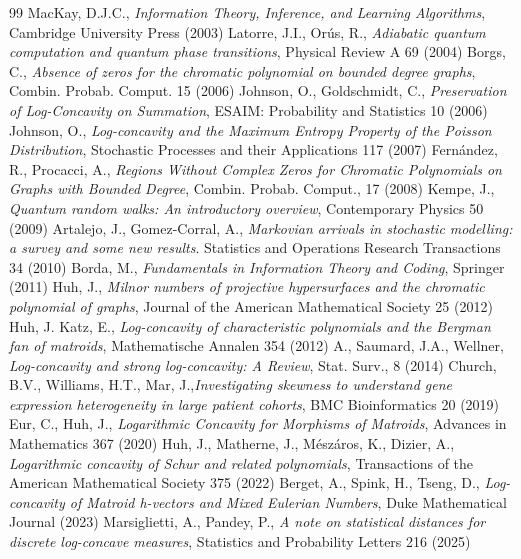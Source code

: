 \documentclass[a4paper,12pt]{article}
\begin{document}
\begin{thebibliography}{99}
 MacKay, D.J.C., \textit{Information Theory, Inference, and Learning Algorithms}, Cambridge University Press (2003)
 Latorre, J.I., Orús, R., \textit{Adiabatic quantum computation and quantum phase transitions}, Physical Review A 69 (2004)
 Borgs, C., \textit{Absence of zeros for the chromatic polynomial on bounded degree graphs}, Combin. Probab. Comput. 15 (2006)
 Johnson, O., Goldschmidt, C., \emph{Preservation of Log-Concavity on Summation}, ESAIM: Probability and Statistics 10 (2006)
 Johnson, O., \emph{Log-concavity and the Maximum Entropy Property of the Poisson Distribution}, Stochastic Processes and their Applications 117 (2007)
 Fernández, R., Procacci, A., \textit{Regions Without Complex Zeros for Chromatic Polynomials on Graphs with Bounded Degree}, Combin. Probab. Comput., 17 (2008)
 Kempe, J., \textit{Quantum random walks: An introductory overview}, Contemporary Physics 50 (2009)
 Artalejo, J., Gomez-Corral, A., \textit{Markovian arrivals in stochastic modelling: a survey and some new results}. Statistics and Operations Research Transactions 34 (2010)
 Borda, M., \textit{Fundamentals in Information Theory and Coding}, Springer (2011)
 Huh, J., \textit{Milnor numbers of projective hypersurfaces and the chromatic polynomial of graphs}, Journal of the American Mathematical Society 25
(2012)
 Huh, J. Katz, E., \textit{Log-concavity of characteristic polynomials and the Bergman fan of matroids}, Mathematische Annalen 354 (2012)
 A., Saumard, J.A., Wellner, \textit{Log-concavity and strong log-concavity: A Review}, Stat. Surv., 8 (2014)
 Church, B.V., Williams, H.T., Mar, J.,\textit{Investigating skewness to understand gene expression heterogeneity in large patient cohorts}, BMC Bioinformatics 20 (2019)
 Eur, C., Huh, J., \textit{Logarithmic Concavity for Morphisms of Matroids}, Advances in Mathematics 367 (2020)
 Huh, J., Matherne, J., Mészáros, K., Dizier, A., \textit{Logarithmic concavity of Schur and related polynomials}, Transactions of the American Mathematical Society 375 (2022)
 Berget, A., Spink, H., Tseng, D., \textit{Log-concavity of Matroid h-vectors and Mixed Eulerian Numbers}, Duke Mathematical Journal (2023)
 Marsiglietti, A., Pandey, P., \textit{A note on statistical distances for discrete log-concave measures}, Statistics and Probability Letters 216 (2025)
\end{thebibliography}
\end{document}
